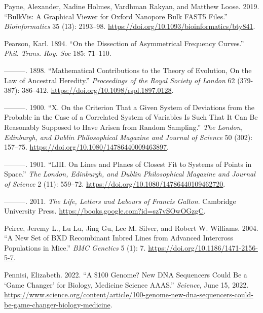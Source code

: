 \documentclass[
]{book}
\newlength{\cslhangindent}
\newlength{\cslentryspacingunit} %
\newenvironment{CSLReferences}[2] %
 {%
  \setlength{\parindent}{0pt}
  \ifodd #1
  \let\oldpar\par
  \def\par{\hangindent=\cslhangindent\oldpar}
  \fi
  \setlength{\parskip}{#2\cslentryspacingunit}
 }%
 {}
\begin{document}
\begin{CSLReferences}{1}{0}
\leavevmode{}%
Payne, Alexander, Nadine Holmes, Vardhman Rakyan, and Matthew Loose. 2019. {``{BulkVis}: A Graphical Viewer for {Oxford} Nanopore Bulk {FAST5} Files.''} \emph{Bioinformatics} 35 (13): 2193--98. \url{https://doi.org/10.1093/bioinformatics/bty841}.

\leavevmode{}%
Pearson, Karl. 1894. {``On the Dissection of Asymmetrical Frequency Curves.''} \emph{Phil. Trans. Roy. Soc} 185: 71--110.

\leavevmode{}%
---------. 1898. {``Mathematical Contributions to the Theory of Evolution, {On} the Law of Ancestral Heredity.''} \emph{Proceedings of the Royal Society of London} 62 (379-387): 386--412. \url{https://doi.org/10.1098/rspl.1897.0128}.

\leavevmode{}%
---------. 1900. {``X. {On} the Criterion That a Given System of Deviations from the Probable in the Case of a Correlated System of Variables Is Such That It Can Be Reasonably Supposed to Have Arisen from Random Sampling.''} \emph{The London, Edinburgh, and Dublin Philosophical Magazine and Journal of Science} 50 (302): 157--75. \url{https://doi.org/10.1080/14786440009463897}.

\leavevmode{}%
---------. 1901. {``{LIII}. {On} Lines and Planes of Closest Fit to Systems of Points in Space.''} \emph{The London, Edinburgh, and Dublin Philosophical Magazine and Journal of Science} 2 (11): 559--72. \url{https://doi.org/10.1080/14786440109462720}.

\leavevmode{}%
---------. 2011. \emph{The {Life}, {Letters} and {Labours} of {Francis Galton}}. {Cambridge University Press}. \url{https://books.google.com?id=sz7vSOwOGzgC}.

\leavevmode{}%
Peirce, Jeremy L., Lu Lu, Jing Gu, Lee M. Silver, and Robert W. Williams. 2004. {``A New Set of {BXD} Recombinant Inbred Lines from Advanced Intercross Populations in Mice.''} \emph{BMC Genetics} 5 (1): 7. \url{https://doi.org/10.1186/1471-2156-5-7}.

\leavevmode{}%
Pennisi, Elizabeth. 2022. {``A \$100 Genome? {New DNA} Sequencers Could Be a {`Game Changer'} for Biology, Medicine \textbar{} {Science} \textbar{} {AAAS}.''} \emph{Science}, June 15, 2022. \url{https://www.science.org/content/article/100-genome-new-dna-sequencers-could-be-game-changer-biology-medicine}.


\end{CSLReferences}
\end{document}
